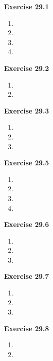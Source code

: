 




\textbf{Exercise 29.1}
\begin{enumerate}
    \item 
    \item 
    \item 
    \item 
\end{enumerate}

\textbf{Exercise 29.2}
\begin{enumerate}
    \item 
    \item 
\end{enumerate}

\textbf{Exercise 29.3}
\begin{enumerate}
    \item 
    \item 
    \item 
\end{enumerate}

\textbf{Exercise 29.5}
\begin{enumerate}
    \item 
    \item 
    \item 
    \item 
\end{enumerate}

\textbf{Exercise 29.6}
\begin{enumerate}
    \item 
    \item 
    \item 
\end{enumerate}

\textbf{Exercise 29.7}
\begin{enumerate}
    \item 
    \item 
    \item 
\end{enumerate}

\textbf{Exercise 29.8}
\begin{enumerate}
    \item 
    \item 
\end{enumerate}

